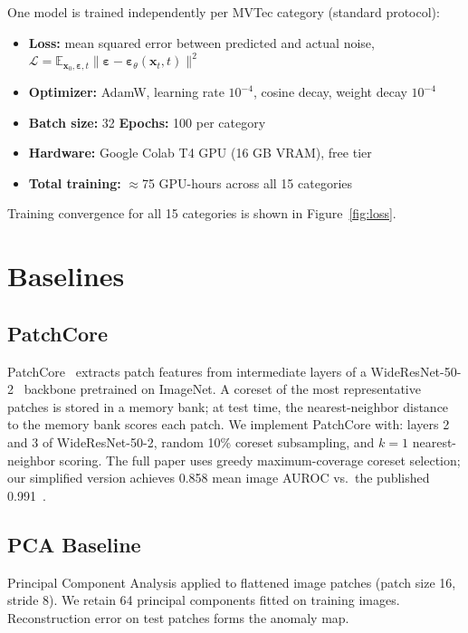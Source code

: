 \documentclass[11pt,letterpaper]{article}
\newcommand{\auroc}{\textsc{AUROC}}
\begin{document}
One model is trained independently per MVTec category (standard protocol):
\begin{itemize}[leftmargin=*,itemsep=2pt]
  \item \textbf{Loss:} mean squared error between predicted and actual noise,
        $\mathcal{L} = \mathbb{E}_{\mathbf{x}_0, \boldsymbol{\varepsilon}, t}
        \|\boldsymbol{\varepsilon} - \boldsymbol{\varepsilon}_\theta(\mathbf{x}_t, t)\|^2$
  \item \textbf{Optimizer:} AdamW, learning rate $10^{-4}$, cosine decay, weight decay $10^{-4}$
  \item \textbf{Batch size:} 32 \quad \textbf{Epochs:} 100 per category
  \item \textbf{Hardware:} Google Colab T4 GPU (16 GB VRAM), free tier
  \item \textbf{Total training:} $\approx$75 GPU-hours across all 15 categories
\end{itemize}

Training convergence for all 15 categories is shown in Figure~\ref{fig:loss}.

\section{Baselines}

\subsection{PatchCore}
PatchCore~\cite{patchcore2022} extracts patch features from intermediate layers of a
WideResNet-50-2~\cite{wrn2016} backbone pretrained on ImageNet. A coreset of the most
representative patches is stored in a memory bank; at test time, the nearest-neighbor
distance to the memory bank scores each patch. We implement PatchCore with:
layers 2 and 3 of WideResNet-50-2, random 10\% coreset subsampling, and
$k{=}1$ nearest-neighbor scoring. The full paper uses greedy maximum-coverage
coreset selection; our simplified version achieves 0.858 mean image \auroc{} vs.\ the
published 0.991~\cite{patchcore2022}.

\subsection{PCA Baseline}
Principal Component Analysis applied to flattened image patches (patch size 16, stride 8).
We retain 64 principal components fitted on training images. Reconstruction error on test
patches forms the anomaly map.
\end{document}

